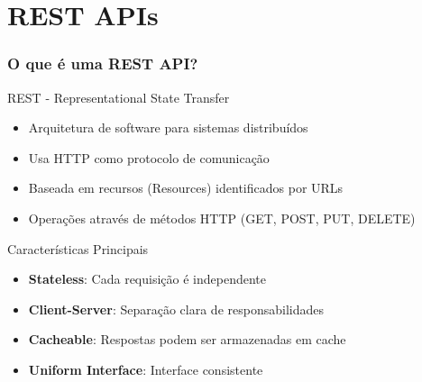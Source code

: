 \documentclass[aspectratio=169]{beamer}
\begin{document}
\section{REST APIs}

\begin{frame}
    \frametitle{O que é uma REST API?}
    \begin{block}{REST - Representational State Transfer}
        \begin{itemize}
            \item Arquitetura de software para sistemas distribuídos
            \item Usa HTTP como protocolo de comunicação
            \item Baseada em recursos (Resources) identificados por URLs
            \item Operações através de métodos HTTP (GET, POST, PUT, DELETE)
        \end{itemize}
    \end{block}
    
    \begin{exampleblock}{Características Principais}
        \begin{itemize}
            \item \textbf{Stateless}: Cada requisição é independente
            \item \textbf{Client-Server}: Separação clara de responsabilidades
            \item \textbf{Cacheable}: Respostas podem ser armazenadas em cache
            \item \textbf{Uniform Interface}: Interface consistente
        \end{itemize}
    \end{exampleblock}
\end{frame}
\end{document}
